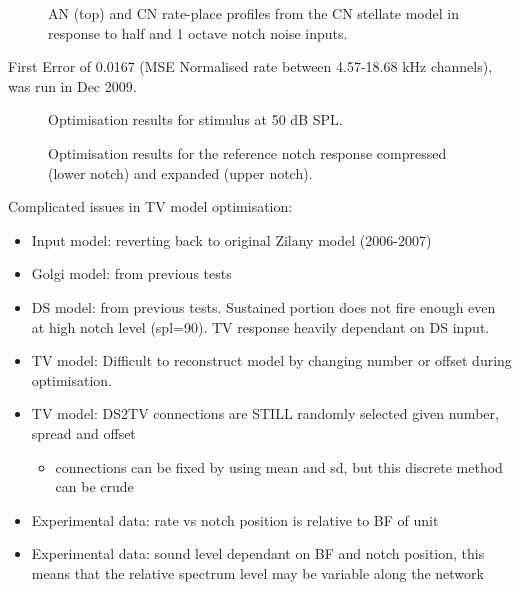 \begin{figure}[tbh]
  \centering

\caption{AN (top) and CN rate-place profiles from the CN stellate
  model in response to half and 1 octave notch noise inputs. }
\label{fig:TVResults}
\end{figure}

First Error of 0.0167 (MSE Normalised rate between 4.57-18.68 kHz channels), was
run in Dec 2009. 



\begin{figure}[h!]
  \centering
  \caption{Optimisation results for stimulus at 50 dB SPL.  }
  \label{fig:TV_resultspl50}
\end{figure}


\begin{figure}[h!]
  \centering
  \caption{Optimisation results for the reference notch response compressed
    (lower notch) and expanded (upper notch).}
  \label{fig:TV_result}
\end{figure}



Complicated issues in TV model optimisation:
\begin{itemize}
\item Input model: reverting back to original Zilany model (2006-2007)
\item Golgi model: from previous tests 
\item DS model: from previous tests.  Sustained portion does not fire enough
  even at high notch level (spl=90).  TV response heavily dependant on DS input.
\item TV model: Difficult to reconstruct model by changing number or offset
  during optimisation.
\item TV model: DS2TV connections are STILL randomly selected given number,
  spread and offset
  \begin{itemize}
  \item connections can be fixed by using mean and sd, but this discrete method can be crude
  \end{itemize}
\item Experimental data: rate vs notch position is relative to BF of unit
\item Experimental data: sound level dependant on BF and notch position, this
  means that the relative spectrum level may be variable along the network
\end{itemize}

